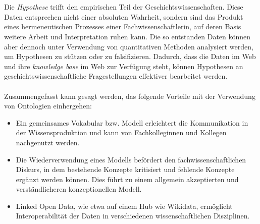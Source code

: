 \documentclass[12pt,a4paper]{article}
\begin{document}
\\
\\
Die \textit{Hypothese} trifft den empirischen Teil der Geschichtswissenschaften. Diese Daten entsprechen nicht einer absoluten Wahrheit, sondern sind das Produkt eines hermeneutischen Prozesses einer Fachwissenschaftlerin, auf deren Basis weitere Arbeit und Interpretation ruhen kann. Die so entstanden Daten können aber dennoch unter Verwendung von quantitativen Methoden analysiert werden, um Hypothesen zu stützen oder zu falsifizieren. Dadurch, dass die Daten im Web und ihre \textit{knowledge base} im Web zur Verfügung steht, können Hypothesen an geschichtswissenschaftliche Fragestellungen effektiver bearbeitet werden.
\\
\\
Zusammengefasst kann gesagt werden, das folgende Vorteile mit der Verwendung von Ontologien einhergehen:
\begin{itemize}
\item Ein gemeinsames Vokabular bzw. Modell erleichtert die Kommunikation in der Wissensproduktion und kann von Fachkolleginnen und Kollegen nachgenutzt werden.
\item Die Wiederverwendung eines Modells befördert den fachwissenschaftlichen Diskurs, in dem bestehende Konzepte kritisiert und fehlende Konzepte ergänzt werden können. Dies führt zu einem allgemein akzeptierten und verständlicheren konzeptionellen Modell.
\item Linked Open Data, wie etwa auf einem Hub wie Wikidata, ermöglicht Interoperabilität der Daten in verschiedenen wissenschaftlichen Disziplinen.
\end{itemize}


\newpage


\newpage
\listoffigures
\end{document}
